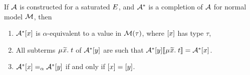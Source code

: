 \begin{lemma}
\label{lem:model-completion}
If $\mathcal{A}$ is constructed for a saturated $E$,
and $\mathcal{A}^\ast$ is a completion of $\mathcal{A}$ for normal model $\mathcal{M}$, then
\begin{enumerate}
\item $\mathcal{A}^\ast [x]$ is $\alpha$-equivalent to a value in $\mathcal{M}( \tau )$, where $[x]$ has type $\tau$,
\item
All subterms $\MU {\Varec{x}}.\; t$ of $\mathcal{A}^\ast [y]$ are such that
$\Val^\ast \ec{y} \interp{ \MU {\Varec{x}}.\; t } = \Val^\ast \ec{x}$. 
\item
$\mathcal{A}^\ast [x] \mathrel{=_\alpha} \mathcal{A}^\ast [y]$ if and only if $[x] = [y]$.
\end{enumerate}
\end{lemma}
